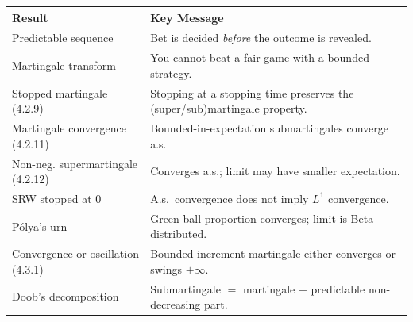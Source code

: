 \documentclass[12pt]{article}
\newcommand{\1}{\mathbf{1}}
\begin{document}
\begin{tcolorbox}[bluebox={Summary of Week 9 Key Results}]
\begin{center}
\renewcommand{\arraystretch}{1.4}
\begin{tabular}{p{5cm} p{8.5cm}}
\hline
\textbf{Result} & \textbf{Key Message} \\
\hline
Predictable sequence & Bet is decided \emph{before} the outcome is revealed. \\
Martingale transform & You cannot beat a fair game with a bounded strategy. \\
Stopped martingale (4.2.9) & Stopping at a stopping time preserves the (super/sub)martingale property. \\
Martingale convergence (4.2.11) & Bounded-in-expectation submartingales converge a.s. \\
Non-neg. supermartingale (4.2.12) & Converges a.s.; limit may have smaller expectation. \\
SRW stopped at 0 & A.s.\ convergence does not imply $L^1$ convergence. \\
P\'{o}lya's urn & Green ball proportion converges; limit is Beta-distributed. \\
Convergence or oscillation (4.3.1) & Bounded-increment martingale either converges or swings $\pm\infty$. \\
Doob's decomposition & Submartingale $=$ martingale $+$ predictable non-decreasing part. \\
\hline
\end{tabular}
\end{center}
\end{tcolorbox}
\end{document}
